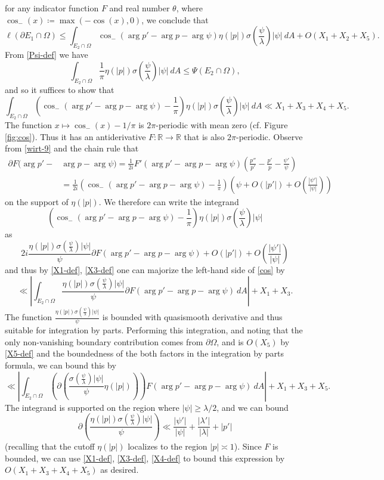\documentclass[12pt]{amsart}
\newcommand{\R}{\mathbb{R}}
\renewcommand{\arg}{\operatorname{arg}}
\begin{document}
for any indicator function $F$ and real number $\theta$, where $\cos_-(x) \coloneqq \max(-\cos(x),0)$, we conclude that
$$ \ell(\partial E_1 \cap \Omega) \leq \int_{E_2 \cap \Omega} \cos_-(\arg p' - \arg p - \arg \psi) \eta(|p|) \sigma\left(\frac{\psi}{\lambda}\right) |\psi|\ dA + O( X_1 + X_2 + X_5 ).$$
From \eqref{Psi-def} we have
$$ \int_{E_2 \cap \Omega} \frac{1}{\pi} \eta(|p|) \sigma\left(\frac{\psi}{\lambda}\right) |\psi|\ dA \leq  \Psi(E_2 \cap \Omega),$$
and so it suffices to show that
\begin{equation}\label{cos}
 \int_{E_2 \cap \Omega} \left(\cos_-(\arg p' - \arg p - \arg \psi)-\frac{1}{\pi}\right) \eta(|p|) \sigma\left(\frac{\psi}{\lambda}\right) |\psi|\ dA \ll X_1 + X_3 + X_4 + X_5.
\end{equation}
The function $x \mapsto \cos_-(x) - 1/\pi$ is $2\pi$-periodic with mean zero (cf. Figure \ref{fig:cos}).  Thus it has an antiderivative $F: \R \to \R$ that is also $2\pi$-periodic.  Observe from \eqref{wirt-9} and the chain rule that
\begin{align*}
    \partial F(\arg p' - &\arg p - \arg \psi) = \frac{1}{2i} F'(\arg p' - \arg p - \arg \psi) \left(\frac{p''}{p'} - \frac{p'}{p} - \frac{\psi'}{\psi} \right) \\
    &= \frac{1}{2i} \left(\cos_-(\arg p' - \arg p - \arg \psi)-\frac{1}{\pi}\right) \left(\psi + O(|p'|) + O\left(\frac{|\psi'|}{|\psi|}\right)\right)
\end{align*}
on the support of $\eta(|p|)$.  We therefore can write the integrand
$$ \left(\cos_-(\arg p' - \arg p - \arg \psi)-\frac{1}{\pi}\right) \eta(|p|) \sigma\left(\frac{\psi}{\lambda}\right) |\psi|$$
as
$$ 2i \frac{\eta(|p|) \sigma\left(\frac{\psi}{\lambda}\right) |\psi|}{\psi} \partial F(\arg p' - \arg p - \arg \psi)
+ O( |p'| ) + O\left(\frac{|\psi'|}{|\psi|}\right)$$
and thus by \eqref{X1-def}, \eqref{X3-def} one can majorize the left-hand side of \eqref{cos} by
$$ \ll \left| \int_{E_2 \cap \Omega} \frac{ \eta(|p|) \sigma\left(\frac{\psi}{\lambda}\right) |\psi|}{\psi}\partial F(\arg p' - \arg p - \arg \psi)\ dA \right| + X_1 + X_3.$$
The function $\frac{ \eta(|p|) \sigma\left(\frac{\psi}{\lambda}\right) |\psi|}{\psi}$ is bounded with quasismooth derivative and thus suitable for integration by parts.  Performing this integration, and noting that the only non-vanishing boundary contribution comes from $\partial \Omega$, and is $O(X_5)$ by \eqref{X5-def} and the boundedness of the both factors in the integration by parts formula, we can bound this by
$$ \ll \left| \int_{E_2 \cap \Omega} \left(\partial \left(\frac{\sigma\left(\frac{\psi}{\lambda}\right) |\psi|}{\psi} \eta(|p|)\right)\right) F(\arg p' - \arg p - \arg \psi)\ dA \right| + X_1 + X_3 + X_5.$$
The integrand is supported on the region where $|\psi| \geq \lambda/2$, and we can bound
$$ \partial\left( \frac{ \eta(|p|) \sigma\left(\frac{\psi}{\lambda}\right) |\psi|}{\psi}\right) \ll \frac{|\psi'|}{|\psi|} + \frac{|\lambda'|}{|\lambda|} + |p'|$$
(recalling that the cutoff $\eta(|p|)$ localizes to the region $|p| \asymp 1$).
Since $F$ is bounded, we can use \eqref{X1-def}, \eqref{X3-def}, \eqref{X4-def} to bound this expression by $O(X_1 + X_3 + X_4 + X_5)$ as desired.
\end{document}

